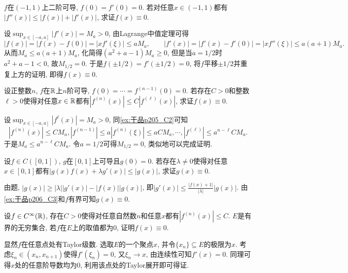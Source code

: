 \begin{exercise} \label{ex:于品p205_C2}
	$f$在$(-1,1)$上二阶可导, $f(0)=f'(0)=0$. 若对任意$x \in (-1,1)$都有$|f''(x)| \leq |f(x)|+|f'(x)|$, 求证$f(x) \equiv 0$. 
\end{exercise}
\begin{solution}
	设$\sup_{x \in [-a,a]}|f'(x)|=M_a>0$, 由Lagrange中值定理可得$$|f(x)| = |f(x) - f(0)| = |x f'(\xi)| \leq aM_a,\qquad |f'(x)| = |f'(x)-f'(0)| = |x f''(\xi)| \leq a(a+1)M_a.$$
	从而$M_a \leq a(a+1)M_a$, 化简得$(a^2+a-1)M_a \geq 0$, 但是当$a=1/2$时$a^2+a-1<0$, 故$M_{1/2}=0$. 于是$f(\pm 1/2)=f'(\pm 1/2)=0$, 将$f$平移$\pm 1/2$并重复上方的证明, 即得$f(x) \equiv 0$. 
\end{solution}

\begin{exercise} \label{ex:于品p206_C3}
	设正整数$n$, $f$在$\mathbb{R}$上$n$阶可导, $f(0) = \cdots = f^{(n-1)}(0)=0$. 若存在$C>0$和整数$\ell >0$使得对任意$x \in \mathbb{R}$都有$|f^{(n)}(x)| \leq C|f^{(\ell)}(x)|$, 求证$f(x) \equiv 0$. 
\end{exercise}
\begin{solution}
	设$\sup_{x \in [-a,a]}|f^{\ell}(x)| = M_a >0$, 同\ref{ex:于品p205_C2}可知$$|f^{(n)}(x)| \leq CM_a, |f^{(n-1)}| \leq a|f^{(n)}(\xi)| \leq aCM_a, \cdots ,|f^{(\ell)}| \leq a^{n-\ell} CM_a.$$
	于是$M_a \leq a^{n-\ell} C M_a$. 令$a = 1/2$可得$M_{1/2}=0$, 类似地可以完成证明. 
\end{solution}

\begin{exercise} \label{ex:于品p205_C1}
	设$f \in C([0,1])$, $g$在$[0,1]$上可导且$g(0)=0$. 若存在$\lambda \neq 0$使得对任意$x \in [0,1]$都有$|g(x)f(x)+\lambda g'(x)| \leq |g(x)|$, 求证$g(x) \equiv 0$. 
\end{exercise}
\begin{solution}
	由题, $|g(x)| \geq |\lambda| |g'(x)| - |f(x)||g(x)|$, 即$|g'(x)| \leq \frac{|f(x)+1|}{|\lambda |} |g(x)|$. 由\ref{ex:于品p206_C3}和$f$有界可知$g(x) \equiv 0$. 
\end{solution}

\begin{exercise} \label{ex:于品p206_C5}
	设$f \in C^{\infty}(\mathbb{R})$, 存在$C>0$使得对任意自然数$n$和任意$x$都有$|f^{(n)}(x)|\leq C$. $E$是有界的无穷集合, 若$f$在$E$上的取值都为$0$, 证明$f(x) \equiv 0$. 
\end{exercise}
\begin{solution}
	显然$f$在任意点处有Taylor级数. 选取$E$的一个聚点$x$, 并令$\{ x_n \} \subseteq E$的极限为$x$. 考虑$\xi _n \in (x_n,x_{n+1})$使得$f'(\xi _n) = 0$, 又$\xi _n \to x$, 由连续性可知$f'(x)=0$. 同理可得$x$处的任意阶导数均为$0$, 利用该点处的Taylor展开即可得证. 
\end{solution}

